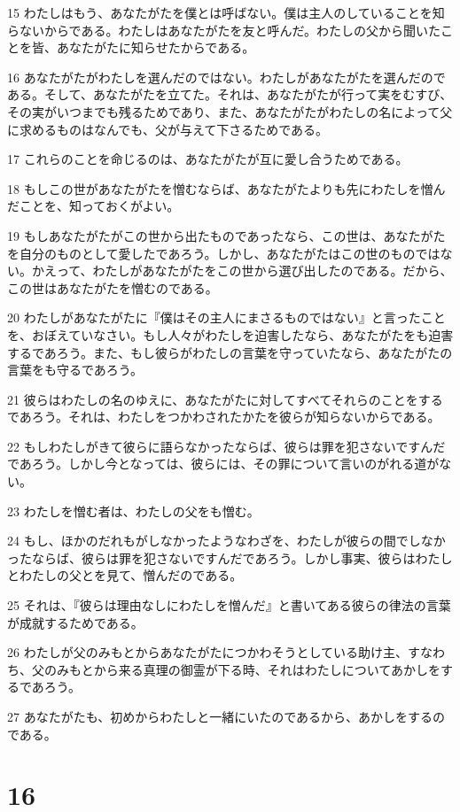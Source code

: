 \par 15 わたしはもう、あなたがたを僕とは呼ばない。僕は主人のしていることを知らないからである。わたしはあなたがたを友と呼んだ。わたしの父から聞いたことを皆、あなたがたに知らせたからである。
\par 16 あなたがたがわたしを選んだのではない。わたしがあなたがたを選んだのである。そして、あなたがたを立てた。それは、あなたがたが行って実をむすび、その実がいつまでも残るためであり、また、あなたがたがわたしの名によって父に求めるものはなんでも、父が与えて下さるためである。
\par 17 これらのことを命じるのは、あなたがたが互に愛し合うためである。
\par 18 もしこの世があなたがたを憎むならば、あなたがたよりも先にわたしを憎んだことを、知っておくがよい。
\par 19 もしあなたがたがこの世から出たものであったなら、この世は、あなたがたを自分のものとして愛したであろう。しかし、あなたがたはこの世のものではない。かえって、わたしがあなたがたをこの世から選び出したのである。だから、この世はあなたがたを憎むのである。
\par 20 わたしがあなたがたに『僕はその主人にまさるものではない』と言ったことを、おぼえていなさい。もし人々がわたしを迫害したなら、あなたがたをも迫害するであろう。また、もし彼らがわたしの言葉を守っていたなら、あなたがたの言葉をも守るであろう。
\par 21 彼らはわたしの名のゆえに、あなたがたに対してすべてそれらのことをするであろう。それは、わたしをつかわされたかたを彼らが知らないからである。
\par 22 もしわたしがきて彼らに語らなかったならば、彼らは罪を犯さないですんだであろう。しかし今となっては、彼らには、その罪について言いのがれる道がない。
\par 23 わたしを憎む者は、わたしの父をも憎む。
\par 24 もし、ほかのだれもがしなかったようなわざを、わたしが彼らの間でしなかったならば、彼らは罪を犯さないですんだであろう。しかし事実、彼らはわたしとわたしの父とを見て、憎んだのである。
\par 25 それは、『彼らは理由なしにわたしを憎んだ』と書いてある彼らの律法の言葉が成就するためである。
\par 26 わたしが父のみもとからあなたがたにつかわそうとしている助け主、すなわち、父のみもとから来る真理の御霊が下る時、それはわたしについてあかしをするであろう。
\par 27 あなたがたも、初めからわたしと一緒にいたのであるから、あかしをするのである。

\chapter{16}

